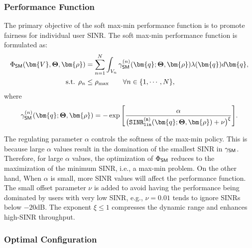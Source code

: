 \subsubsection{Performance Function}\label{SM-Objective}
The primary objective of the soft max-min performance function is to promote fairness for individual user SINR. The soft max-min performance function is formulated as:
\begin{align}\label{soft-max-min-objective}
    \Phi_{{\sf SM}}(\bm{V}, \mathbf{\Theta}, \bm{\rho}) &=  \sum_{n=1}^{N} \int_{V_n} \gamma^{(n)}_{{\sf SM}} (\bm{q}; \mathbf{\Theta}, \bm{\rho}) \lambda(\bm{q}) d\bm{q}, \\
    \textrm{s.t. } \rho_n &\leq \rho_{\max} \qquad \forall n \in \{1,\cdots, N\}, \label{soft-max-min-objective-constraint}
\end{align}
where 
\begin{align}\label{Soft-max-min}
\gamma^{(n)}_{\sf SM}(\bm{q}; \mathbf{\Theta}, \bm{\rho})
= - \exp  \Bigg[ \frac{\alpha}{\big(\mathtt{SINR^{(n)}_{lin}}(\bm{q}; \mathbf{\Theta}, \bm{\rho}) + \nu \big)^{\xi}}\Bigg].
\end{align}

The regulating parameter $\alpha$ controls the softness of the max-min policy. This is because large $\alpha$ values result in the domination of the smallest SINR in $\gamma_{{\sf SM}}$. Therefore, for large $\alpha$ values, the optimization of $\Phi_{{\sf SM}}$ reduces to the maximization of the minimum SINR, i.e., a max-min problem. On the other hand, When $\alpha$ is small, more SINR values will affect the performance function. The small offset parameter $\nu$ is added to avoid having the performance being dominated by users with very low SINR, e.g., $\nu = 0.01$ tends to ignore SINRs below $-20$dB. The exponent $\xi \leq 1$ compresses the dynamic range and enhances high-SINR throughput.  



\subsubsection{Optimal Configuration}\label{SM-Optimal-Configuration}

